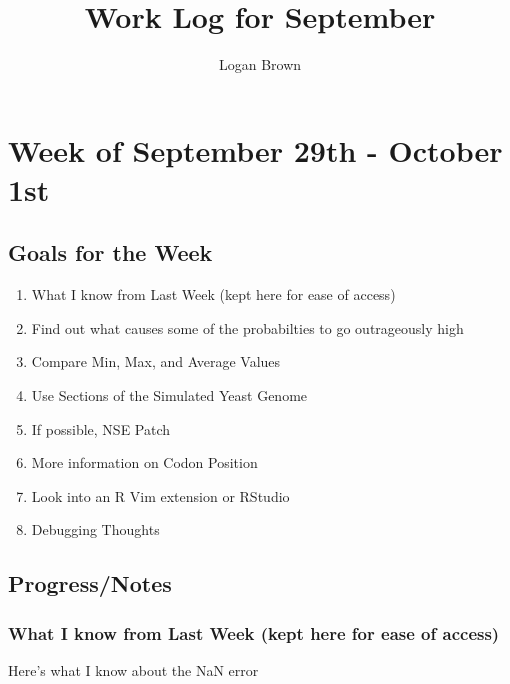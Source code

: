 

\title{Work Log for September}
\author{Logan Brown}


\maketitle


\setcounter{section}{4} %
\setcounter{subsection}{-1}
\setcounter{subsubsection}{0}

\section{Week of September 29th - October 1st}
\subsection{Goals for the Week}
\begin{enumerate}
\item What I know from Last Week (kept here for ease of access)
\item Find out what causes some of the probabilties to go outrageously high
\item Compare Min, Max, and Average Values
\item Use Sections of the Simulated Yeast Genome
\item If possible, NSE Patch
\item More information on Codon Position
\item Look into an R Vim extension or RStudio
\item Debugging Thoughts
\end{enumerate}

\subsection{Progress/Notes}

\subsubsection{What I know from Last Week (kept here for ease of access)}

Here's what I know about the NaN error

